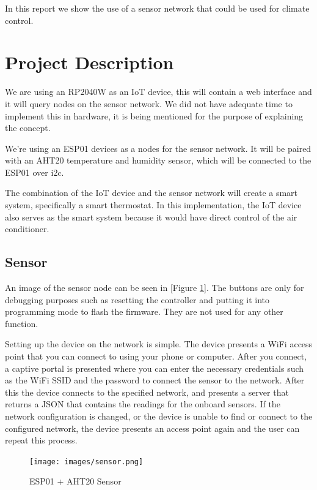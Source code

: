 \documentclass[10pt, journal]{IEEEtran} %
\begin{document}
In this report we show the use of a sensor network that could be used for climate control.

\section{Project Description}

We are using an RP2040W as an IoT device, this will contain a web interface and it will
query nodes on the sensor network.
We did not have adequate time to implement this in hardware,
it is being mentioned for the purpose of explaining the concept.

We're using an ESP01 devices as a nodes for the sensor network.
It will be paired with an AHT20 temperature and humidity sensor, 
which will be connected to the ESP01 over i2c.

The combination of the IoT device and the sensor network will create a smart system, specifically a smart thermostat.
In this implementation, 
the IoT device also serves as the smart system because it would have direct control of the air conditioner.

\subsection{Sensor}

An image of the sensor node can be seen in [Figure \ref{fig:sensor}].
The buttons are only for debugging purposes such as resetting the controller 
and putting it into programming mode to flash the firmware.
They are not used for any other function.

Setting up the device on the network is simple.
The device presents a WiFi access point that you can connect to using your phone or computer.
After you connect, a captive portal is presented where you can enter the necessary credentials 
such as the WiFi SSID and the password to connect the sensor to the network.
After this the device connects to the specified network,
and presents a server that returns a JSON that contains the readings for the onboard sensors.
If the network configuration is changed, or the device is unable to find or connect to the configured network,
the device presents an access point again and the user can repeat this process.

\begin{figure}[htbp]
    \centering
    \texttt{[image: images/sensor.png]}
    \caption{ESP01 + AHT20 Sensor}
    \label{fig:sensor}
\end{figure}
\end{document}
